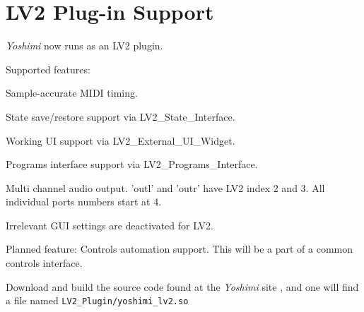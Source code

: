 %
%
%

\section{LV2 Plug-in Support}
\label{sec:lv2_plugin}

   \textsl{Yoshimi} now runs as an LV2 plugin.

Supported features:

   \begin{enumber}
      \item Sample-accurate MIDI timing.
      \item State save/restore support via LV2\_State\_Interface.
      \item Working UI support via LV2\_External\_UI\_Widget.
      \item Programs interface support via LV2\_Programs\_Interface.
      \item Multi channel audio output. 'outl' and 'outr' have LV2 index 2
         and 3. All individual ports numbers start at 4.
      \item Irrelevant GUI settings are deactivated for LV2.
   \end{enumber}

   Planned feature: Controls automation support. This will be a part of a
   common controls interface.

   Download and build the source code found at the
   \textsl{Yoshimi} site \cite{yoshimi},
   and one will find a file named
   \texttt{LV2\_Plugin/yoshimi\_lv2.so}

